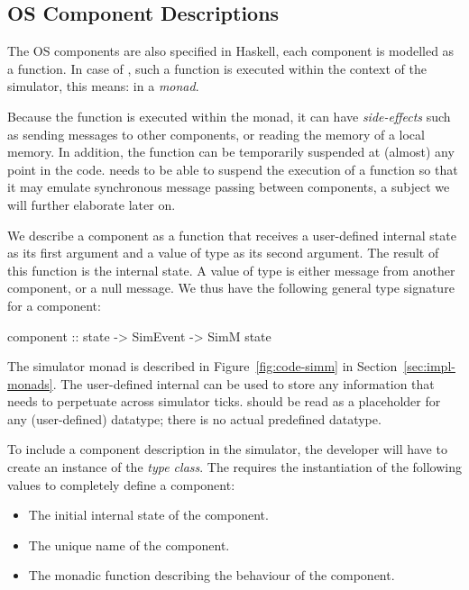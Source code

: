 \subsection{OS Component Descriptions}

The OS components are also specified in Haskell, each component is modelled as a function.
In case of \soosim, such a function is executed within the context of the simulator, this means: in a \emph{monad}.

Because the function is executed within the monad, it can have \emph{side-effects} such as sending messages to other components, or reading the memory of a local memory.
In addition, the function can be temporarily suspended at (almost) any point in the code.
\soosim needs to be able to suspend the execution of a function so that it may emulate synchronous message passing between components, a subject we will further elaborate later on.

We describe a component as a function that receives a user-defined internal state as its first argument and a value of type  as its second argument.
The result of this function is the internal state.
A value of type  is either message from another component, or a null message.
We thus have the following general type signature for a component:
\begin{code}
component :: state -> SimEvent -> SimM state
\end{code}

The simulator monad  is described in Figure~\ref{fig:code-simm} in Section~\ref{sec:impl-monads}.
The user-defined internal  can be used to store any information that needs to perpetuate across simulator ticks.
 should be read as a placeholder for any (user-defined) datatype; there is no actual predefined  datatype.

To include a component description in the simulator, the developer will have to create an instance of the  \emph{type class}.
The  requires the instantiation of the following values to completely define a component:

\begin{itemize}
  \item The initial internal state of the component.
  \item The unique name of the component.
  \item The monadic function describing the behaviour of the component.
\end{itemize}

